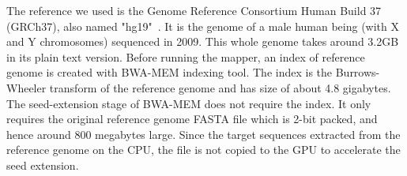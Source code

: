 The reference we used is the Genome Reference Consortium Human Build 37 (GRCh37), also named "hg19"~\cite{ncbi:hg19}. It is the genome of a male human being (with X and Y chromosomes) sequenced in 2009. This whole genome takes around 3.2GB in its plain text version. Before running the mapper, an index of reference genome is created with BWA-MEM indexing tool. The index is the Burrows-Wheeler transform of the reference genome and has size of about 4.8 gigabytes. The seed-extension stage of BWA-MEM does not require the index. It only requires the original reference genome FASTA file which is 2-bit packed, and hence around 800 megabytes large. Since the target sequences extracted from the reference genome on the CPU, the file is not copied to the GPU to accelerate the seed extension.

